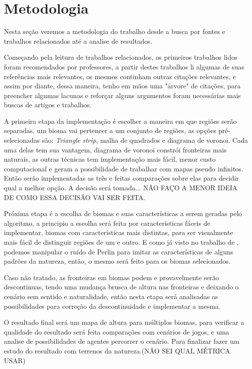 \chapter{Metodologia}
Nesta seção veremos a metodologia do trabalho desde a busca por fontes e trabalhos
relacionados até a analise de resultados.

Começando pela leitura de trabalhos relacionados, os primeiros trabalhos lidos
foram recomendados por professores, a partir destes trabalhos li algumas de suas
referências mais relevantes, os mesmos continham outras citações relevantes, e
assim por diante, dessa maneira, tenho em mãos uma "árvore" de citações,
para preencher algumas lacunas e reforçar alguns argumentos foram necessárias
mais buscas de artigos e trabalhos.

A primeira etapa da implementação é escolher a maneira em que regiões serão
separadas, um bioma vai pertencer a um conjunto de regiões, as opções
pré-selecionadas são: \textit{Triangle strip}, malha de quadrados e diagrama de
voronoi. Cada uma delas tem sua vantagem, diagrama de voronoi constrói fronteiras
mais naturais, as outras técnicas tem implementação mais fácil, menor custo
computacional e geram a possibilidade de trabalhar com mapas pseudo infinitos.
Então serão implementadas as três e feitas comparações sobre elas para decidir
qual a melhor opção. A decisão será tomada...
NÃO FAÇO A MENOR IDEIA DE COMO ESSA DECISÃO VAI SER FEITA.

Próxima etapa é a escolha de biomas e suas características a serem geradas pelo%
algoritmo, a principio a escolha será feita por características fáceis de
implementar, biomas com características mais distintas, para ser visualmente
mais fácil de distinguir regiões de um e outro.%
E como já visto no trabalho de \cite{carli2012canion}, podemos manipular o ruído
de Perlin para imitar as características de alguns padrões da natureza, então, 
o mesmo será feito para os biomas selecionados.

Caso não tratado, as fronteiras em biomas podem e provavelmente serão
descontinuas, tendo uma mudança brusca de altura nas fronteiras e deixando o
cenário sem sentido e naturalidade, então nesta etapa será analisadas as
possibilidades para correção da descontinuidade e implementar a mesma.

O resultado final será um mapa de altura para múltiplos biomas, para verificar
a qualidade do resultado será feita comparações com cenários de jogos, e uma
analise de possibilidades de agentes percorrer o cenário. Para finalizar fazer
um estudo do resultado com terrenos da natureza.(NÃO SEI QUAL MÉTRICA USAR)